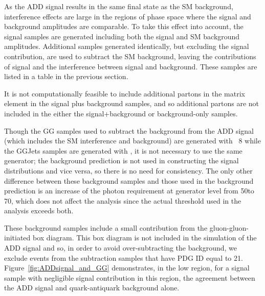 As the ADD signal results in the same final state as the SM
background, interference effects are large in the regions of phase space where the signal and background amplitudes are comparable.
To take this effect into account, the signal samples are generated including both the signal and SM background amplitudes.
Additional samples generated identically, but excluding the signal contribution, are used to subtract the SM background, leaving the contributions of
signal and the interference between signal and background. These samples are listed in a table in the previous section.

It is not computationally feasible to include additional partons in
the matrix element in the signal plus background samples, and so
additional partons are not included in the either the 
signal+background or background-only samples.

Though the \textrm{GG} samples used to subtract the background from the ADD signal (which includes the SM interference and background) are generated with \PYTHIA~8 while the \textrm{GGJets}
samples are generated with \SHERPA, it is not necessary to use the same generator; the background prediction is not used in constructing the signal distributions and vice versa, so there is
no need for consistency. The only other difference between these background samples and those used in the background prediction is an increase of the photon \pt requirement at
generator level from 50\GeV to 70\GeV, which does not affect the
analysis since the actual \pt threshold used in the analysis exceeds both.

These background samples include a small contribution from the gluon-gluon-initiated box diagram.
This box diagram is not included in the simulation of the ADD signal and so, in order to avoid over-subtracting the background, we exclude events from the \PGg\PGg subtraction samples that have PDG ID equal to 21.
Figure~\ref{fig:ADDsignal_and_GG} demonstrates, in the low \mgg region, for a signal sample with negligible signal contribution in this region, the agreement between the ADD signal and quark-antiquark background alone.

